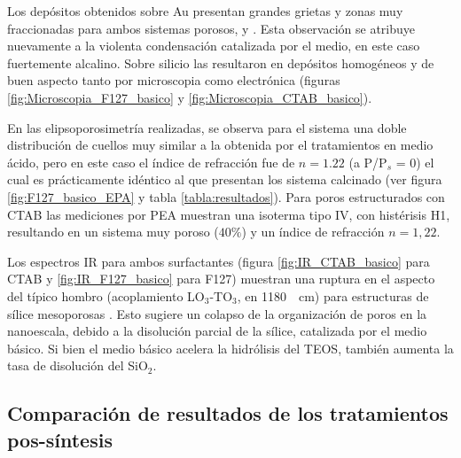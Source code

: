 		 Los depósitos obtenidos sobre Au presentan grandes grietas y zonas muy fraccionadas para ambos sistemas porosos, \pdmF\space y \pdmC. Esta observación se atribuye nuevamente a la violenta condensación catalizada por el medio, en este caso fuertemente alcalino. Sobre silicio las \pdm\space resultaron en depósitos homogéneos y de buen aspecto tanto por microscopia como electrónica (figuras \ref{fig:Microscopia_F127_basico} y \ref{fig:Microscopia_CTAB_basico}).

		 En las elipsoporosimetría realizadas, se observa para el sistema \pdmF\space una doble distribución de cuellos muy similar a la obtenida por el tratamientos en medio ácido, pero en este caso el índice de refracción fue de $n=1.22$ (a P/P$_s$ = 0) el cual es prácticamente idéntico al que presentan los sistema calcinado (ver figura \ref{fig:F127_basico_EPA} y tabla \ref{tabla:resultados}). Para poros estructurados con CTAB las mediciones por PEA muestran una isoterma tipo IV, con histérisis H1, resultando en un sistema muy poroso ($40\%$) y un índice de refracción $n=1,22$.
	
		 Los espectros IR para ambos surfactantes (figura \ref{fig:IR_CTAB_basico} para CTAB y \ref{fig:IR_F127_basico} para F127) muestran una ruptura en el aspecto del típico hombro (acoplamiento LO$_3$-TO$_3$, en \SI{1180}{\per\cm}) para estructuras de sílice mesoporosas \cite{Olsen1989,Innocenzi2003,Angelome2008}. Esto sugiere un colapso de la organización de poros en la nanoescala, debido a la disolución parcial de la sílice, catalizada por el medio básico. Si bien el medio básico acelera la hidrólisis del TEOS, también aumenta la tasa de disolución del SiO$_2$.\cite{Mazer1994,Niibori2000,Gorrepati2010}

	 \subsection{Comparación de resultados de los tratamientos pos-síntesis}
	 		
